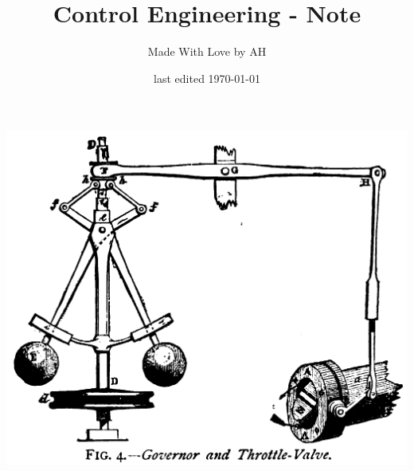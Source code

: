 \documentclass{article}
\title{Control Engineering - Note}
\author{Made With Love by AH}
\date{last edited \today}
\begin{document}

\makeatletter
    \begin{titlepage}
        \begin{center}
            \includegraphics[width=0.7\linewidth]{logo.png}\\[4ex]
            {\huge \bfseries  \@title }\\[2ex] 
            {\LARGE  \@author}\\[50ex] 
            {\large \@date}
        \end{center}
    \end{titlepage}
\makeatother

\maketitle
\tableofcontents
\pagebreak


\end{document}
